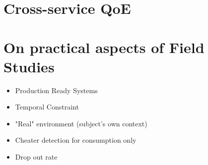 \section{Cross-service QoE}

\section{On practical aspects of Field Studies}
\begin{itemize}
\item Production Ready Systems
\item Temporal Constraint
\item "Real" environment (subject's own context)
\item Cheater detection for consumption only
\item Drop out rate
\end{itemize}